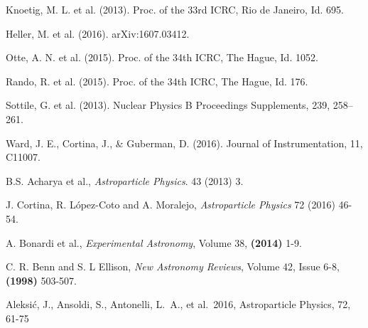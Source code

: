 \documentclass{PoS}
\begin{document}
\begin{thebibliography}{99}

 Knoetig, M. L. et al. (2013). Proc. of the 33rd ICRC, Rio de Janeiro, Id. 695.

Heller, M. et al. (2016). arXiv:1607.03412.

 Otte, A. N. et al. (2015). Proc. of the 34th ICRC, The Hague, Id. 1052.

Rando, R. et al. (2015). Proc. of the 34th ICRC, The Hague, Id. 176.

Sottile, G. et al. (2013). Nuclear Physics B Proceedings Supplements, 239, 258--261.

Ward, J. E., Cortina, J., \& Guberman, D. (2016). Journal of Instrumentation, 11, C11007.

B.S. Acharya et al.,
\emph{Astroparticle Physics}. 43 (2013) 3.

J. Cortina, R. L\'{o}pez-Coto and A. Moralejo,
\emph{Astroparticle Physics} 72 (2016) 46-54.

A. Bonardi et al., \emph{Experimental Astronomy}, Volume 38, {\bf(2014)} 1-9.

C. R. Benn and S. L Ellison, \emph{New Astronomy Reviews}, Volume 42, Issue 6-8, {\bf(1998)} 503-507.



 Aleksi{\'c}, J., Ansoldi, S., Antonelli, L.~A., et al.\ 2016, Astroparticle Physics, 72, 61-75









\end{thebibliography}
\end{document}
